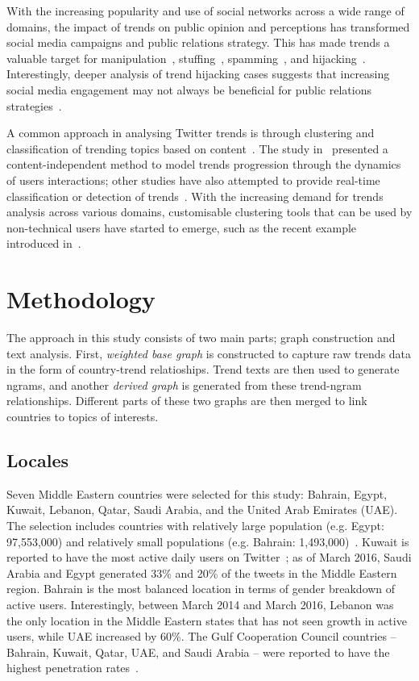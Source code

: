 \documentclass[conference]{IEEEtran}
\begin{document}
With the increasing popularity and use of social networks across a
wide range of domains, the impact of trends on public opinion and
perceptions has transformed social media campaigns and public
relations strategy. This has made trends a valuable target for
manipulation~\cite{Zhang2017}, stuffing~\cite{Irani2010},
spamming~\cite{Sedhai2015,Chu2012}, and
hijacking~\cite{VanDam2016}. Interestingly, deeper analysis of trend
hijacking cases suggests that increasing social media engagement may
not always be beneficial for public relations
strategies~\cite{Sanderson2016}.

A common approach in analysing Twitter trends is through clustering
and classification of trending topics based on
content~\cite{Zubiaga2011,Benhardus2013,Ferragina2015,albishry-et-al:iccci2017}.
The study in~\cite{TenThij2016} presented a content-independent method
to model trends progression through the dynamics of users
interactions; other studies have also attempted to provide real-time
classification or detection of
trends~\cite{Mathioudakis2010,Zubiaga2015}. With the increasing demand
for trends analysis across various domains, customisable clustering
tools that can be used by non-technical users have started to emerge,
such as the recent example introduced in~\cite{Arn2018}.

\section{Methodology}\label{method}

The approach in this study consists of two main parts; graph construction
and text analysis. First, {\emph{weighted base graph}} is constructed to 
capture raw trends data in the form of country-trend relatioships. Trend 
texts are then used to generate ngrams, and another {\emph{derived graph}}
is generated from these trend-ngram relationships. Different parts of these 
two graphs are then merged to link countries to topics of interests.

\subsection{Locales}

Seven Middle Eastern countries were selected for this study: Bahrain,
Egypt, Kuwait, Lebanon, Qatar, Saudi Arabia, and the United Arab
Emirates (UAE). The selection includes countries with relatively large
population (e.g. Egypt: 97,553,000) and relatively small populations
(e.g. Bahrain:
1,493,000)~\cite{UnitedNationsDepartmentofEconomicandSocialAffairs2017}.
Kuwait is reported to have the most active daily users on
Twitter~\cite{Salem2017}; as of March 2016, Saudi Arabia and Egypt
generated 33\% and 20\% of the tweets in the Middle Eastern
region. Bahrain is the most balanced location in terms of gender
breakdown of active users. Interestingly, between March 2014 and March
2016, Lebanon was the only location in the Middle Eastern states that
has not seen growth in active users, while UAE increased by 60\%. The
Gulf Cooperation Council countries -- Bahrain, Kuwait, Qatar, UAE, and
Saudi Arabia -- were reported to have the highest penetration
rates~\cite{Salem2017}.
\end{document}
